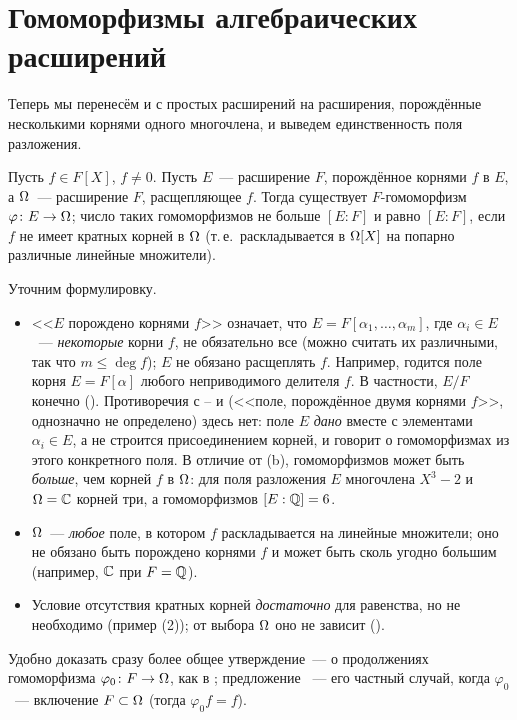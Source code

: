 \section{Гомоморфизмы алгебраических расширений}

Теперь мы перенесём  и  с простых расширений на расширения, порождённые несколькими корнями одного
многочлена, и выведем единственность поля разложения.

\begin{proposition}[2.12]
Пусть $f\in F[X]$, $f\ne0$. Пусть $E$~--- расширение $F$, порождённое корнями $f$ в $E$, а $\Omega$~--- расширение $F$, расщепляющее
$f$. Тогда существует $F$-гомоморфизм $\varphi\colon E\to\Omega$; число таких гомоморфизмов не больше $[E:F]$ и равно $[E:F]$,
если $f$ не имеет кратных корней в $\Omega$ (т.\,е.\ раскладывается в $\Omega[X]$ на попарно различные линейные множители).
\end{proposition}

Уточним формулировку.
\begin{itemize}[leftmargin=*]
\item <<$E$ порождено корнями $f$>> означает, что $E=F[\alpha_1,\dots,\alpha_m]$, где $\alpha_i\in E$~--- \emph{некоторые}
корни $f$, не обязательно все (можно считать их различными, так что $m\le\deg f$); $E$ не обязано расщеплять $f$. Например, годится поле корня $E=F[\alpha]$ любого
неприводимого делителя $f$. В частности, $E/F$ конечно (). Противоречия с -- и 
(<<поле, порождённое двумя корнями $f$>>, однозначно не определено) здесь нет: поле $E$ \emph{дано} вместе с
элементами $\alpha_i\in E$, а не строится присоединением корней, и  говорит о гомоморфизмах из этого
конкретного поля. В отличие от (b), гомоморфизмов может быть \emph{больше}, чем корней $f$ в $\Omega$: для поля
разложения $E$ многочлена $X^3-2$ и $\Omega=\mathbb C$ корней три, а гомоморфизмов $[E:\mathbb Q]=6$.
\item $\Omega$~--- \emph{любое} поле, в котором $f$ раскладывается на линейные множители; оно не обязано быть порождено
корнями $f$ и может быть сколь угодно большим (например, $\mathbb C$ при $F=\mathbb Q$).
\item Условие отсутствия кратных корней \emph{достаточно} для равенства, но не необходимо (пример (2)); от
выбора $\Omega$ оно не зависит ().
\end{itemize}

Удобно доказать сразу более общее утверждение~--- о продолжениях гомоморфизма $\varphi_0\colon F\to\Omega$, как в
; предложение ~--- его частный случай, когда $\varphi_0$~--- включение $F\subset\Omega$ (тогда $\varphi_0f=f$).

